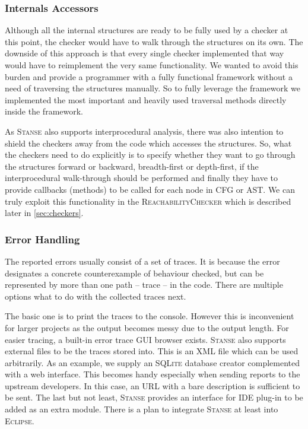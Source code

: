 \documentclass[10pt]{llncs}
\newcommand{\Stanse}{\textsc{Stanse}\xspace}
\newcommand{\RC}{\textsc{ReachabilityChecker}\xspace}
\begin{document}
\vspace{-.5\baselineskip}
\subsubsection{Internals Accessors}
Although all the internal structures are ready to be fully used by a checker
at this point, the checker would have to walk through the structures on its
own.  The downside of this approach is that every single checker implemented
that way would have to reimplement the very same functionality. We wanted to
avoid this burden and provide a programmer with a fully functional framework
without a need of traversing the structures manually. So to fully leverage the
framework we implemented the most important and heavily used traversal methods
directly inside the framework.

As \Stanse also supports interprocedural analysis, there was also intention
to shield the checkers away from the code which accesses the structures. So,
what the checkers need to do explicitly is to specify whether they want to go
through the structures forward or backward, breadth-first or depth-first, if
the interprocedural walk-through should be performed and finally they have to
provide callbacks (methods) to be called for each node in CFG or AST. We can
truly exploit this functionality in the \RC which is described later in
\ref{sec:checkers}.

\vspace{-.5\baselineskip}
\subsubsection{Error Handling}
The reported errors usually consist of a set of traces. It is because the
error designates a concrete counterexample of behaviour checked, but can be
represented by more than one path -- trace -- in the code. There are multiple
options what to do with the collected traces next.

The basic one is to print the traces to the console. However this is
inconvenient for larger projects as the output becomes messy due to the output
length. For easier tracing, a built-in error trace GUI browser exists.
\Stanse also supports external files to be the traces stored into. This is an
XML file which can be used arbitrarily. As an example, we supply an
\textsc{SQLite} database creator complemented with a web interface. This
becomes handy especially when sending reports to the upstream developers. In
this case, an URL with a bare description is sufficient to be sent. The last
but not least, \Stanse provides an interface for IDE plug-in to be added as an
extra module. There is a plan to integrate \Stanse at least into
\textsc{Eclipse}.
\end{document}
